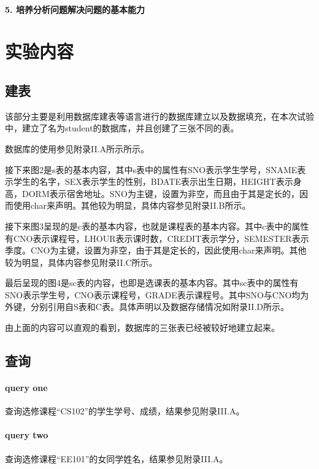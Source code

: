 \documentclass[UTF8]{ctexart}
\begin{document}
    \paragraph{5. 培养分析问题解决问题的基本能力}
    
    \section{实验内容}
    \subsection{建表}
    该部分主要是利用数据库建表等语言进行的数据库建立以及数据填充，在本次试验中，建立了名为student的数据库，并且创建了三张不同的表。

    数据库的使用参见附录II.A所示所示。

    接下来图2是s表的基本内容，其中s表中的属性有SNO表示学生学号，SNAME表示学生的名字，SEX表示学生的性别，BDATE表示出生日期，HEIGHT表示身高，DORM表示宿舍地址。SNO为主键，设置为非空，而且由于其是定长的，因而使用char来声明。其他较为明显，具体内容参见附录II.B所示。

    接下来图3呈现的是c表的基本内容，也就是课程表的基本内容。其中c表中的属性有CNO表示课程号，LHOUR表示课时数，CREDIT表示学分，SEMESTER表示季度。CNO为主键，设置为非空，由于其是定长的，因此使用char来声明。其他较为明显，具体内容参见附录II.C所示。

    最后呈现的图4是sc表的内容，也即是选课表的基本内容。其中sc表中的属性有SNO表示学生号，CNO表示课程号，GRADE表示课程号。其中SNO与CNO均为外键，分别引用自S表和C表。具体声明以及数据存储情况如附录II.D所示。

    由上面的内容可以直观的看到，数据库的三张表已经被较好地建立起来。

    \subsection{查询}
    \paragraph{query one}
    查询选修课程“CS102”的学生学号、成绩，结果参见附录III.A。


    \paragraph{query two}
    查询选修课程“EE101”的女同学姓名，结果参见附录III.A。
\end{document}
